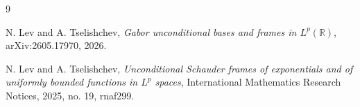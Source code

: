 \documentclass[11pt]{article}
\begin{document}
\begin{thebibliography}{9}

N. Lev and A. Tselishchev,
\emph{Gabor unconditional bases and frames in \(L^p(\mathbb R)\)},
arXiv:2605.17970, 2026.

N. Lev and A. Tselishchev,
\emph{Unconditional Schauder frames of exponentials and of uniformly bounded
functions in \(L^p\) spaces},
International Mathematics Research Notices, 2025, no. 19, rnaf299.

\end{thebibliography}
\end{document}

